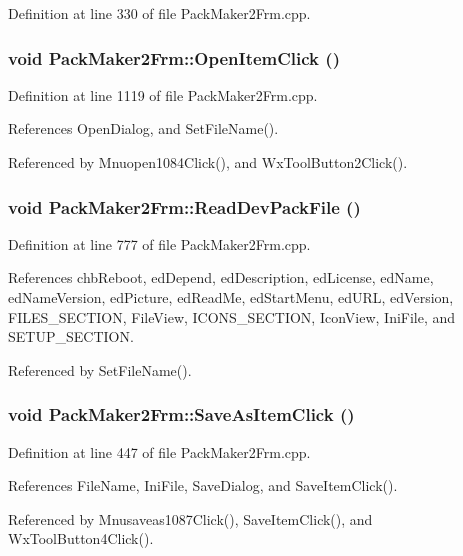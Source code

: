Definition at line 330 of file Pack\-Maker2Frm.cpp.
\subsubsection{\setlength{\rightskip}{0pt plus 5cm}void Pack\-Maker2Frm::Open\-Item\-Click ()}\label{class_pack_maker2_frm_e99ff0193c90d26d116b4515d4a0f036}




Definition at line 1119 of file Pack\-Maker2Frm.cpp.

References Open\-Dialog, and Set\-File\-Name().

Referenced by Mnuopen1084Click(), and Wx\-Tool\-Button2Click().
\subsubsection{\setlength{\rightskip}{0pt plus 5cm}void Pack\-Maker2Frm::Read\-Dev\-Pack\-File ()}\label{class_pack_maker2_frm_1537071e05e58251f5f1798aa29308d0}




Definition at line 777 of file Pack\-Maker2Frm.cpp.

References chb\-Reboot, ed\-Depend, ed\-Description, ed\-License, ed\-Name, ed\-Name\-Version, ed\-Picture, ed\-Read\-Me, ed\-Start\-Menu, ed\-URL, ed\-Version, FILES\_\-SECTION, File\-View, ICONS\_\-SECTION, Icon\-View, Ini\-File, and SETUP\_\-SECTION.

Referenced by Set\-File\-Name().
\subsubsection{\setlength{\rightskip}{0pt plus 5cm}void Pack\-Maker2Frm::Save\-As\-Item\-Click ()}\label{class_pack_maker2_frm_46b378d93e23bb67d6375e7c4ede183d}




Definition at line 447 of file Pack\-Maker2Frm.cpp.

References File\-Name, Ini\-File, Save\-Dialog, and Save\-Item\-Click().

Referenced by Mnusaveas1087Click(), Save\-Item\-Click(), and Wx\-Tool\-Button4Click().
